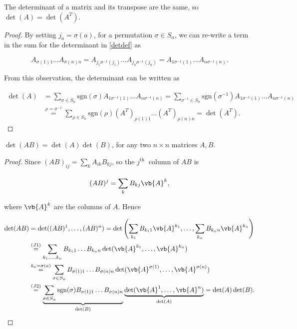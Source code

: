 \documentclass[a4paper,12pt]{report}
\begin{document}
\begin{lemma}
The determinant of a matrix and its transpose are the same, so $\det(A) = \det(A^T)$.
\end{lemma}

\begin{proof}
By setting $j_a = \sigma(a)$, for a permutation $\sigma \in S_n$, we can re-write a term in the sum for the determinant in \cref{detdef} as 

\begin{equation}
A_{\sigma(1)1} \ldots A_{\sigma(n)n} = A_{j_1\sigma^{-1}(j_1)} \ldots A_{j_n\sigma^{-1}(j_n)} = A_{1\sigma^{-1}(1)} \ldots A_{n\sigma^{-1}(n)}.
\end{equation}

From this observation, the determinant can be written as

\begin{equation}
\begin{aligned}
\det(A) &= \sum_{\sigma \in S_n} \text{sgn}(\sigma) A_{1\sigma^{-1}(1)} \ldots A_{n\sigma^{-1}(n)} = \sum_{\sigma^{-1} \in S_n} \text{sgn}(\sigma^{-1}) A_{1\sigma^{-1}(1)} \ldots A_{n\sigma^{-1}(n)} \\
&\overset{\rho = \sigma^{-1}}{=} \sum_{\rho \in S_n} \text{sgn}(\rho) (A^T)_{\rho(1)1} \ldots (A^T)_{\rho(n)n} = \det(A^T).
\end{aligned}
\end{equation}
\end{proof}

\begin{theorem}
\(\det (AB) = \det (A) \det (B)\), for any two \(n \times  n\) matrices \(A, B\).   
\end{theorem}

\begin{proof}
Since \((AB)_{ij} = \sum_{k}^{} A_{ik}B_{kj}   \), so the \(j^{\text{th }} \) column of \(AB\) is 

\begin{equation}
    (AB)^{j} = \sum_{k}^{} B_{kj}\vb{A} ^{k},
\end{equation}

where \(\vb{A} ^{k} \) are the columns of \(A\). Hence

\begin{equation}
    \begin{aligned}
    \det(AB) &= \det((AB)^1, \ldots, (AB)^n) = \det\left(\sum_{k_1} B_{k_1 1} \vb{A} ^{k_1}, \ldots, \sum_{k_n} B_{k_n n} \vb{A} ^{k_n}\right) \\
    &\overset{(J1)}{=} \sum_{k_1, \ldots, k_n} B_{k_1 1} \ldots B_{k_n n} \det(\vb{A} ^{k_1}, \ldots, \vb{A} ^{k_n}) \\
    &\overset{k_a = \sigma(a)}{=} \sum_{\sigma \in S_n} B_{\sigma(1)1} \ldots B_{\sigma(n)n} \det(\vb{A} ^{\sigma(1)}, \ldots, \vb{A} ^{\sigma(n)}) \\
    &\overset{(J2)}{=} \underbrace{\sum_{\sigma \in S_n} \operatorname{sgn}(\sigma) B_{\sigma(1)1} \ldots B_{\sigma(n)n}}_{\det (B)} \underbrace{\det(\vb{A} ^1, \ldots, \vb{A} ^n)}_{\det(A)} = \det(A) \det(B).
    \end{aligned}
\end{equation}
\end{proof}
\end{document}
